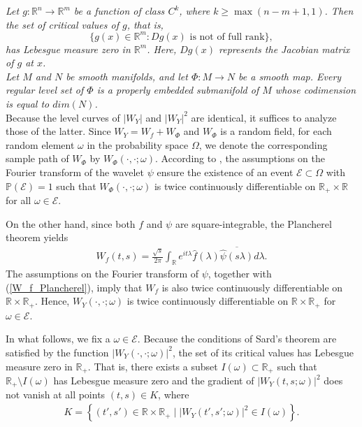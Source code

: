 \documentclass{amsart}
\begin{document}
 \cite[Chapter 6]{lee2013introduction}
{\it Let \( g : \mathbb{R}^n \to \mathbb{R}^m \) be a function of class \( C^k \), where \( k \ge \max(n - m + 1, 1) \). Then the set of \emph{critical values} of \(g \), that is,
\[
\{ g(x) \in \mathbb{R}^m : Dg(x) \text{ is not of full rank} \},
\]
has Lebesgue measure zero in \( \mathbb{R}^m \). Here, $Dg(x)$ represents the Jacobian matrix of $g$ at $x$.
}
\\
 \cite[Corollary A.26]{lee2018introduction}  {\it Let
$M$ and $N$ be smooth manifolds, and let $\Phi:M\rightarrow N$ be a smooth map. Every regular level
set of $\Phi$   is a properly embedded submanifold of $M$ whose codimension is equal to
$dim(N)$.}
\\




Because the level curves of $|W_{Y}|$ and $|W_{Y}|^2$ are identical, it suffices to analyze those of the latter.
Since $W_{Y}=W_{f}+W_{\Phi}$ and $W_{\Phi}$
is a random field, for each random element $\omega$ in the probability space $\Omega$,
we denote the corresponding sample path of $W_{\Phi}$ by $W_{\Phi}(\cdot,\cdot;\omega)$.
According to \cite[Proposition 1]{liu2024analyzing}, the assumptions on the Fourier transform of the wavelet $\psi$
ensure the existence of an event $\mathcal{E}\subset \Omega$ with $\mathbb{P}(\mathcal{E})=1$ such that
 $W_{\Phi}(\cdot,\cdot;\omega)$ is twice continuously differentiable on $\mathbb{R}_{+}\times \mathbb{R}$ for all $\omega\in \mathcal{E}$.


On the other hand, since both $f$ and $\psi$ are square-integrable, the Plancherel theorem yields
\begin{align}\label{W_f_Plancherel}
W_{f}(t,s) = \frac{\sqrt{s}}{2\pi}\int_{\mathbb{R}}e^{it\lambda}\widehat{f}(\lambda)\overline{\widehat{\psi}(s\lambda)}d\lambda.
\end{align}
The assumptions on the Fourier transform of $\psi$, together with (\ref{W_f_Plancherel}),
imply that $W_{f}$ is also twice continuously differentiable on $\mathbb{R}\times \mathbb{R}_{+}$.
Hence, $W_{Y}(\cdot,\cdot;\omega)$
is twice continuously differentiable on $\mathbb{R}\times \mathbb{R}_{+}$ for $\omega\in\mathcal{E}$.




In what follows, we fix a $\omega\in\mathcal{E}$.
Because the conditions of Sard's theorem are satisfied by the function $|W_{Y}(\cdot,\cdot;\omega)|^{2}$,
the set of its critical values has Lebesgue measure zero in $\mathbb{R}_{+}$.
That is, there exists a subset $I(\omega)\subset\mathbb{R}_{+}$ such that
$\mathbb{R}_{+}\setminus I(\omega)$ has Lebesgue measure zero and the gradient of
$|W_{Y}(t,s;\omega)|^2$ does not vanish at all points $(t,s)\in K$, where
\begin{align*}
K = \left\{(t',s')\in \mathbb{R}\times \mathbb{R}_{+}\mid |W_{Y}(t',s';\omega)|^2 \in  I(\omega)\right\}.
\end{align*}
\end{document}
